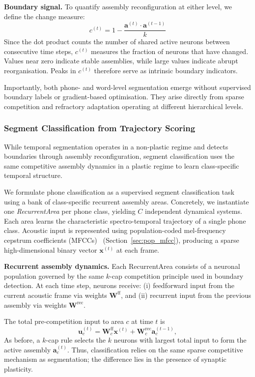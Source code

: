 \noindent\textbf{Boundary signal.}
To quantify assembly reconfiguration at either level, we define the change measure:
\begin{equation}
c^{(t)} = 1 - \frac{\mathbf{a}^{(t)} \cdot \mathbf{a}^{(t-1)}}{k}
\label{eq:change}
\end{equation}
Since the dot product counts the number of shared active neurons between consecutive time steps, $c^{(t)}$ measures the fraction of neurons that have changed. Values near zero indicate stable assemblies, while large values indicate abrupt reorganisation. Peaks in $c^{(t)}$ therefore serve as intrinsic boundary indicators.


Importantly, both phone- and word-level segmentation emerge without supervised boundary labels or gradient-based optimisation. They arise directly from sparse competition and refractory adaptation operating at different hierarchical levels.

\subsubsection{Segment Classification from Trajectory Scoring}
While temporal segmentation operates in a non-plastic regime and detects boundaries through assembly reconfiguration, segment classification uses the same competitive assembly dynamics in a plastic regime to learn class-specific temporal structure.

We formulate phone classification as a supervised segment classification task using a bank of class-specific recurrent assembly areas. Concretely, we instantiate one \emph{RecurrentArea} per phone class, yielding $C$ independent dynamical systems. Each area learns the characteristic spectro-temporal trajectory of a single phone class.
Acoustic input is represented using population-coded mel-frequency cepstrum coefficients (MFCCs)~\cite{Davis80-COP} (Section~\ref{sec:pop_mfcc}), producing a sparse high-dimensional binary vector $\mathbf{x}^{(t)}$ at each frame.

\noindent\textbf{Recurrent assembly dynamics.}
Each RecurrentArea consists of a neuronal population governed by the same $k$-cap competition principle used in boundary detection. At each time step, neurons receive:
(i) feedforward input from the current acoustic frame via weights $\mathbf{W}^{\mathrm{ff}}$, and
(ii) recurrent input from the previous assembly via weights $\mathbf{W}^{\mathrm{rec}}$.

The total pre-competition input to area $c$ at time $t$ is
\begin{equation}
\mathbf{u}_c^{(t)} =
\mathbf{W}_c^{\mathrm{ff}} \mathbf{x}^{(t)}
+
\mathbf{W}_c^{\mathrm{rec}} \mathbf{a}_c^{(t-1)},
\end{equation}
As before, a $k$-cap rule selects the $k$ neurons with largest total input to form the active assembly $\mathbf{a}_c^{(t)}$. Thus, classification relies on the same sparse competitive mechanism as segmentation; the difference lies in the presence of synaptic plasticity.


